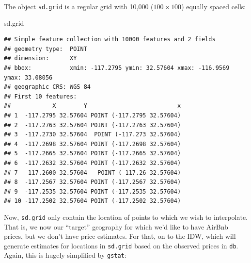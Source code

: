 \documentclass[
]{book}
\newenvironment{Shaded}{\begin{snugshade}}{\end{snugshade}}
\newcommand{\DataTypeTok}[1]{\textcolor[rgb]{0.13,0.29,0.53}{#1}}
\newcommand{\DecValTok}[1]{\textcolor[rgb]{0.00,0.00,0.81}{#1}}
\newcommand{\KeywordTok}[1]{\textcolor[rgb]{0.13,0.29,0.53}{\textbf{#1}}}
\newcommand{\NormalTok}[1]{#1}
\newcommand{\OperatorTok}[1]{\textcolor[rgb]{0.81,0.36,0.00}{\textbf{#1}}}
\newcommand{\StringTok}[1]{\textcolor[rgb]{0.31,0.60,0.02}{#1}}
\begin{document}
\begin{Shaded}
\end{Shaded}

The object \texttt{sd.grid} is a regular grid with 10,000 (\(100 \times 100\)) equally spaced cells:

\begin{Shaded}
\begin{Highlighting}[]
\NormalTok{sd.grid}
\end{Highlighting}
\end{Shaded}

\begin{verbatim}
## Simple feature collection with 10000 features and 2 fields
## geometry type:  POINT
## dimension:      XY
## bbox:           xmin: -117.2795 ymin: 32.57604 xmax: -116.9569 ymax: 33.08056
## geographic CRS: WGS 84
## First 10 features:
##            X        Y                          x
## 1  -117.2795 32.57604 POINT (-117.2795 32.57604)
## 2  -117.2763 32.57604 POINT (-117.2763 32.57604)
## 3  -117.2730 32.57604  POINT (-117.273 32.57604)
## 4  -117.2698 32.57604 POINT (-117.2698 32.57604)
## 5  -117.2665 32.57604 POINT (-117.2665 32.57604)
## 6  -117.2632 32.57604 POINT (-117.2632 32.57604)
## 7  -117.2600 32.57604   POINT (-117.26 32.57604)
## 8  -117.2567 32.57604 POINT (-117.2567 32.57604)
## 9  -117.2535 32.57604 POINT (-117.2535 32.57604)
## 10 -117.2502 32.57604 POINT (-117.2502 32.57604)
\end{verbatim}

Now, \texttt{sd.grid} only contain the location of points to which we wish to interpolate. That is, we now our ``target'' geography for which we'd like to have AirBnb prices, but we don't have price estimates. For that, on to the IDW, which will generate estimates for locations in \texttt{sd.grid} based on the observed prices in \texttt{db}. Again, this is hugely simplified by \texttt{gstat}:
\end{document}
